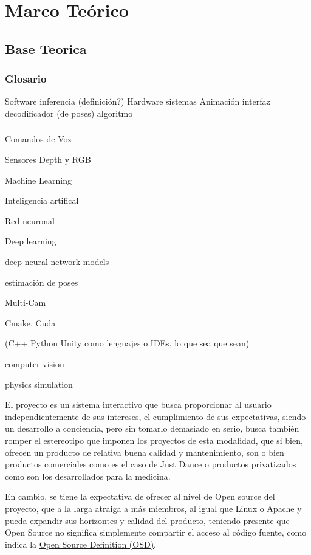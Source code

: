 \chapter{Marco Teórico}

\section{Base Teorica}

\subsection{Glosario}

Software
inferencia (definición?)
Hardware
sistemas
Animación
interfaz
decodificador (de poses)
algoritmo

\subsection{}

Comandos de Voz 

Sensores Depth y RGB


Machine Learning

Inteligencia artifical

Red neuronal

Deep learning





deep neural network models

estimación de poses


Multi-Cam

Cmake, Cuda

(C++ Python Unity como lenguajes o IDEs, lo que sea que sean)

computer vision

physics simulation





El proyecto es un sistema interactivo que busca proporcionar al usuario independientemente de sus intereses, el cumplimiento de sus expectativas, siendo un desarrollo a conciencia, pero sin tomarlo demasiado en serio, busca también romper el estereotipo que imponen los proyectos de esta modalidad, que si bien, ofrecen un producto de relativa buena calidad y mantenimiento, son o bien productos comerciales como es el caso de Just Dance o productos privatizados como son los desarrollados para la medicina. 

En cambio, se tiene la expectativa de ofrecer al nivel de Open source del proyecto, que a la larga atraiga a más miembros, al igual que Linux o Apache y pueda expandir sus horizontes y calidad del producto, teniendo presente que Open Source no significa simplemente compartir el acceso al código fuente, como indica la \href{https://opensource.org/docs/definition.html}{Open Source Definition (OSD)}. 

